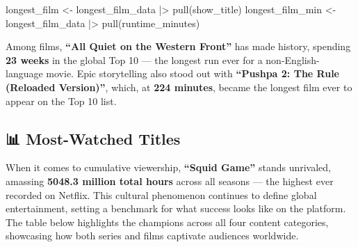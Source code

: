 \documentclass[
  12pt,
  letterpaper,
  DIV=11,
  numbers=noendperiod]{scrartcl}
\newenvironment{Shaded}{\begin{snugshade}}{\end{snugshade}}
\newcommand{\FunctionTok}[1]{\textcolor[rgb]{0.28,0.35,0.67}{#1}}
\newcommand{\NormalTok}[1]{\textcolor[rgb]{0.00,0.23,0.31}{#1}}
\newcommand{\OtherTok}[1]{\textcolor[rgb]{0.00,0.23,0.31}{#1}}
\newcommand{\SpecialCharTok}[1]{\textcolor[rgb]{0.37,0.37,0.37}{#1}}
\begin{document}
\begin{Shaded}
\begin{Highlighting}[]
\NormalTok{longest\_film }\OtherTok{\textless{}{-}}\NormalTok{ longest\_film\_data }\SpecialCharTok{|\textgreater{}} \FunctionTok{pull}\NormalTok{(show\_title)}
\NormalTok{longest\_film\_min }\OtherTok{\textless{}{-}}\NormalTok{ longest\_film\_data }\SpecialCharTok{|\textgreater{}} \FunctionTok{pull}\NormalTok{(runtime\_minutes)}
\end{Highlighting}
\end{Shaded}

Among films, \textbf{``All Quiet on the Western Front''} has made
history, spending \textbf{23 weeks} in the global Top 10 --- the longest
run ever for a non-English-language movie. Epic storytelling also stood
out with \textbf{``Pushpa 2: The Rule (Reloaded Version)''}, which, at
\textbf{224 minutes}, became the longest film ever to appear on the Top
10 list.

\subsection{📊 Most-Watched Titles}\label{most-watched-titles}

When it comes to cumulative viewership,
\textbf{``\label{top_title}{Squid Game}''} stands
unrivaled, amassing
\textbf{\label{squid_game_total}{5048.3} million total
hours} across all seasons --- the highest ever recorded on Netflix. This
cultural phenomenon continues to define global entertainment, setting a
benchmark for what success looks like on the platform. The table below
highlights the champions across all four content categories, showcasing
how both series and films captivate audiences worldwide.
\end{document}
